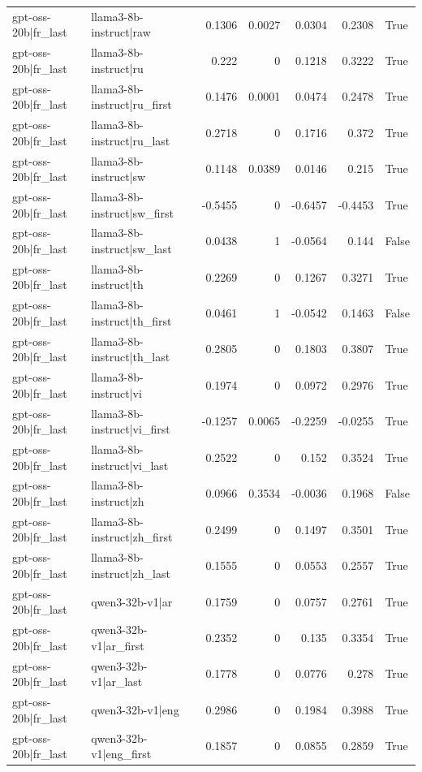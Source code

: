 \begin{table}
\begin{tabular}{l l r r r r l}
gpt-oss-20b|fr_last & llama3-8b-instruct|raw & 0.1306 & 0.0027 & 0.0304 & 0.2308 & True \\
gpt-oss-20b|fr_last & llama3-8b-instruct|ru & 0.222 & 0 & 0.1218 & 0.3222 & True \\
gpt-oss-20b|fr_last & llama3-8b-instruct|ru_first & 0.1476 & 0.0001 & 0.0474 & 0.2478 & True \\
gpt-oss-20b|fr_last & llama3-8b-instruct|ru_last & 0.2718 & 0 & 0.1716 & 0.372 & True \\
gpt-oss-20b|fr_last & llama3-8b-instruct|sw & 0.1148 & 0.0389 & 0.0146 & 0.215 & True \\
gpt-oss-20b|fr_last & llama3-8b-instruct|sw_first & -0.5455 & 0 & -0.6457 & -0.4453 & True \\
gpt-oss-20b|fr_last & llama3-8b-instruct|sw_last & 0.0438 & 1 & -0.0564 & 0.144 & False \\
gpt-oss-20b|fr_last & llama3-8b-instruct|th & 0.2269 & 0 & 0.1267 & 0.3271 & True \\
gpt-oss-20b|fr_last & llama3-8b-instruct|th_first & 0.0461 & 1 & -0.0542 & 0.1463 & False \\
gpt-oss-20b|fr_last & llama3-8b-instruct|th_last & 0.2805 & 0 & 0.1803 & 0.3807 & True \\
gpt-oss-20b|fr_last & llama3-8b-instruct|vi & 0.1974 & 0 & 0.0972 & 0.2976 & True \\
gpt-oss-20b|fr_last & llama3-8b-instruct|vi_first & -0.1257 & 0.0065 & -0.2259 & -0.0255 & True \\
gpt-oss-20b|fr_last & llama3-8b-instruct|vi_last & 0.2522 & 0 & 0.152 & 0.3524 & True \\
gpt-oss-20b|fr_last & llama3-8b-instruct|zh & 0.0966 & 0.3534 & -0.0036 & 0.1968 & False \\
gpt-oss-20b|fr_last & llama3-8b-instruct|zh_first & 0.2499 & 0 & 0.1497 & 0.3501 & True \\
gpt-oss-20b|fr_last & llama3-8b-instruct|zh_last & 0.1555 & 0 & 0.0553 & 0.2557 & True \\
gpt-oss-20b|fr_last & qwen3-32b-v1|ar & 0.1759 & 0 & 0.0757 & 0.2761 & True \\
gpt-oss-20b|fr_last & qwen3-32b-v1|ar_first & 0.2352 & 0 & 0.135 & 0.3354 & True \\
gpt-oss-20b|fr_last & qwen3-32b-v1|ar_last & 0.1778 & 0 & 0.0776 & 0.278 & True \\
gpt-oss-20b|fr_last & qwen3-32b-v1|eng & 0.2986 & 0 & 0.1984 & 0.3988 & True \\
gpt-oss-20b|fr_last & qwen3-32b-v1|eng_first & 0.1857 & 0 & 0.0855 & 0.2859 & True \\

\end{tabular}
\end{table}
